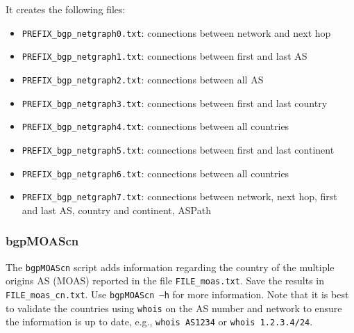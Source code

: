 \documentclass[documentation]{subfiles}
\begin{document}
It creates the following files:
\begin{itemize}
    \item {\tt PREFIX\_bgp\_netgraph0.txt}: connections between network and next hop
    \item {\tt PREFIX\_bgp\_netgraph1.txt}: connections between first and last AS
    \item {\tt PREFIX\_bgp\_netgraph2.txt}: connections between all AS
    \item {\tt PREFIX\_bgp\_netgraph3.txt}: connections between first and last country
    \item {\tt PREFIX\_bgp\_netgraph4.txt}: connections between all countries
    \item {\tt PREFIX\_bgp\_netgraph5.txt}: connections between first and last continent
    \item {\tt PREFIX\_bgp\_netgraph6.txt}: connections between all countries
    \item {\tt PREFIX\_bgp\_netgraph7.txt}: connections between network, next hop, first and last AS, country and continent, ASPath
\end{itemize}

\clearpage

\subsubsection{bgpMOAScn}\label{bgpMOAScn}
The {\tt bgpMOAScn} script adds information regarding the country of the multiple origins AS (MOAS) reported in the file {\tt FILE\_moas.txt}.
Save the results in {\tt FILE\_moas\_cn.txt}. Use {\tt bgpMOAScn --h} for more information.
Note that it is best to validate the countries using {\tt whois} on the AS number and network to ensure the information is up to date, e.g., {\tt whois AS1234} or {\tt whois 1.2.3.4/24}.
\end{document}
